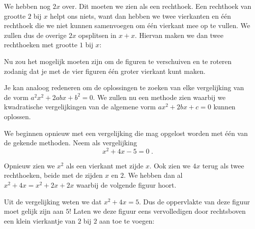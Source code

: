 We hebben nog $2x$ over. Dit moeten we zien als een rechthoek. Een rechthoek van grootte $2$ bij $x$ helpt ons niets, want dan hebben we twee vierkanten en \'e\'en rechthoek die we niet kunnen samenvoegen om \'e\'en vierkant mee op te vullen. We zullen dus de overige $2x$ opsplitsen in $x + x$. Hiervan maken we dan twee rechthoeken met grootte $1$ bij $x$:

\begin{center}

\end{center}

Nu zou het mogelijk moeten zijn om de figuren te verschuiven en te roteren zodanig dat je met de vier figuren \'e\'en groter vierkant kunt maken.


\answer[5cm]{
\begin{center}

\end{center}
}



Je kan analoog redeneren om de oplossingen te zoeken van elke vergelijking van de vorm $a^2x^2+2abx+b^2=0$. We zullen nu een methode zien waarbij we kwadratische vergelijkingen van de algemene vorm $ax^2+2bx+c=0$ kunnen oplossen.

We beginnen opnieuw met een vergelijking die mag opgelost worden met \'e\'en van de gekende methoden. Neem als vergelijking
$$
x^2+4x-5=0\;.
$$

Opnieuw zien we $x^2$ als een vierkant met zijde $x$. Ook zien we $4x$ terug als twee rechthoeken, beide met de zijden $x$ en $2$. We hebben dan al $x^2+4x=x^2+2x+2x$ waarbij de volgende figuur hoort.
\begin{center}

\end{center}

Uit de vergelijking weten we dat $x^2+4x=5$. Dus de oppervlakte van deze figuur moet gelijk zijn aan $5$! Laten we deze figuur eens vervolledigen door rechtsboven een klein vierkantje van $2$ bij $2$ aan toe te voegen:

\begin{center}

\end{center}

